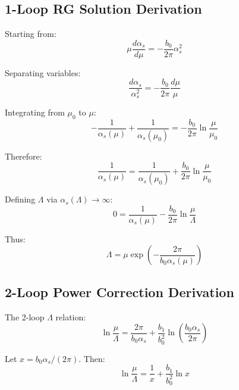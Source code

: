 \documentclass[11pt,a4paper]{article}
\theoremstyle{definition}
\begin{document}
\subsection{1-Loop RG Solution Derivation}
\label{subsec:1loop-deriv}

Starting from:
\begin{equation}
\label{eq:app-rge-1loop}
\mu\frac{d\alpha_s}{d\mu} = -\frac{b_0}{2\pi}\alpha_s^2
\end{equation}

Separating variables:
\begin{equation}
\label{eq:app-separate}
\frac{d\alpha_s}{\alpha_s^2} = -\frac{b_0}{2\pi}\frac{d\mu}{\mu}
\end{equation}

Integrating from $\mu_0$ to $\mu$:
\begin{equation}
\label{eq:app-integrate}
-\frac{1}{\alpha_s(\mu)} + \frac{1}{\alpha_s(\mu_0)}
  = -\frac{b_0}{2\pi}\ln\frac{\mu}{\mu_0}
\end{equation}

Therefore:
\begin{equation}
\label{eq:app-1loop-sol}
\frac{1}{\alpha_s(\mu)} = \frac{1}{\alpha_s(\mu_0)} + \frac{b_0}{2\pi}\ln\frac{\mu}{\mu_0}
\end{equation}

Defining $\Lambda$ via $\alpha_s(\Lambda) \to \infty$:
\begin{equation}
\label{eq:app-lambda-def}
0 = \frac{1}{\alpha_s(\mu)} - \frac{b_0}{2\pi}\ln\frac{\mu}{\Lambda}
\end{equation}

Thus:
\begin{equation}
\label{eq:app-lambda-result}
\Lambda = \mu \exp\left(-\frac{2\pi}{b_0\alpha_s(\mu)}\right)
\end{equation}

\subsection{2-Loop Power Correction Derivation}
\label{subsec:2loop-deriv}

The 2-loop $\Lambda$ relation:
\begin{equation}
\label{eq:app-2loop-impl}
\ln\frac{\mu}{\Lambda} = \frac{2\pi}{b_0\alpha_s}
  + \frac{b_1}{b_0^2}\ln\left(\frac{b_0\alpha_s}{2\pi}\right)
\end{equation}

Let $x = b_0\alpha_s/(2\pi)$. Then:
\begin{equation}
\label{eq:app-2loop-x}
\ln\frac{\mu}{\Lambda} = \frac{1}{x} + \frac{b_1}{b_0^2}\ln x
\end{equation}
\end{document}
